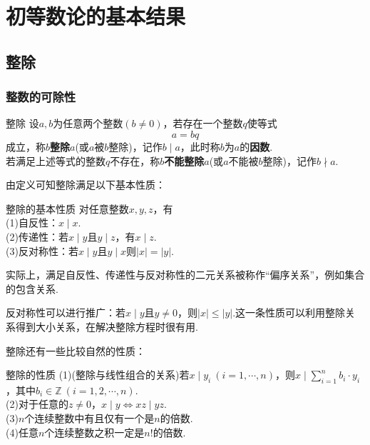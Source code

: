 \chapter{初等数论的基本结果}

\section{整除}

\subsection{整数的可除性}

\begin{definition}{整除}
	设$a,b$为任意两个整数$(b \neq 0)$，若存在一个整数$q$使等式$$a=bq$$成立，称$b$\textbf{整除}$a$(或$a$被$b$整除)，记作$b \mid a$，此时称$b$为$a$的\textbf{因数}. \\
	若满足上述等式的整数$q$不存在，称$b$\textbf{不能整除}$a$(或$a$不能被$b$整除)，记作$b \nmid a$.
\end{definition}

由定义可知整除满足以下基本性质：

\begin{theorem}{整除的基本性质}
	对任意整数$x,y,z$，有 \\
	(1)自反性：$x \mid x$. \\
	(2)传递性：若$x \mid y$且$y \mid z$，有$x \mid z$. \\
	(3)反对称性：若$x \mid y$且$y \mid x$则$|x|=|y|$.
\end{theorem}
\begin{remark}
	实际上，满足自反性、传递性与反对称性的二元关系被称作“偏序关系”，例如集合的包含关系.
\end{remark}
\begin{remark}
	反对称性可以进行推广：若$x \mid y$且$y \neq 0$，则$|x| \leq |y|$.这一条性质可以利用整除关系得到大小关系，在解决整除方程时很有用.
\end{remark}

整除还有一些比较自然的性质：

\begin{theorem}{整除的性质}
	(1)(整除与线性组合的关系)若$x \mid y_i~(i=1,\cdots ,n)$，则$x \mid \sum_{i=1}^{n} b_i \cdot y_i$，其中$b_i \in \mathbb{Z}~(i=1,2,\cdots ,n)$. \\
	(2)对于任意的$z \neq 0$，$x \mid y \Leftrightarrow xz \mid yz$. \\
	(3)$n$个连续整数中有且仅有一个是$n$的倍数. \\
	(4)任意$n$个连续整数之积一定是$n!$的倍数.
\end{theorem}

